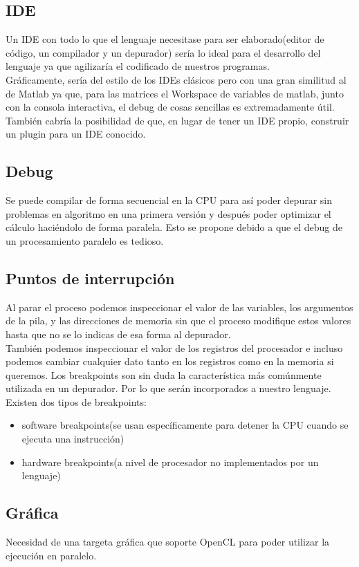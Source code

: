 \documentclass[12pt,a4paper]{article}
\begin{document}
\subsection{IDE}
Un IDE con todo lo que el lenguaje necesitase para ser elaborado(editor de código, un compilador y un depurador) sería lo ideal para el desarrollo del lenguaje ya que agilizaría el codificado de nuestros programas.\\
Gráficamente, sería del estilo de los IDEs clásicos pero con una gran similitud al de Matlab ya que, para las matrices el Workspace de variables de matlab, junto con la consola interactiva, el debug de cosas sencillas es extremadamente útil.\\
También cabría la posibilidad de que, en lugar de tener un IDE propio, construir un plugin para un IDE conocido.

\subsection{Debug}
Se puede compilar de forma secuencial en la CPU para así poder depurar sin
problemas en algoritmo en una primera versión y después poder optimizar el cálculo haciéndolo de forma paralela. Esto se propone debido a que el debug de un procesamiento paralelo es tedioso.
\subsection{Puntos de interrupción}
Al parar el proceso podemos inspeccionar el valor de las variables, los argumentos de la pila, y las direcciones de memoria sin que el proceso modifique estos valores hasta que no se lo indicas de esa forma al depurador.\\
También podemos inspeccionar el valor de los registros del procesador e incluso podemos cambiar cualquier dato tanto en los registros como en la memoria si queremos. Los breakpoints son sin duda la característica más comúnmente utilizada en un depurador. Por lo que serán incorporados a nuestro lenguaje.
\\ Existen dos tipos de breakpoints:
\begin{itemize}
\item software breakpoints(se usan específicamente para detener la CPU cuando se ejecuta una instrucción)
\item hardware breakpoints(a nivel de procesador no implementados por un lenguaje)
\end{itemize}
\subsection{Gráfica}
Necesidad de una targeta gráfica que soporte OpenCL para poder utilizar la
ejecución en paralelo.
\end{document}
